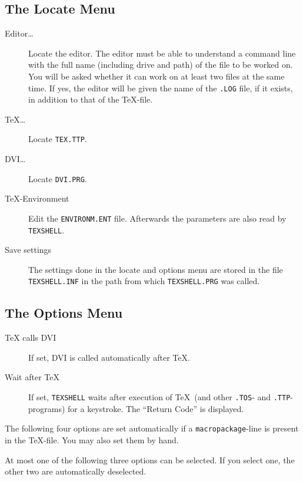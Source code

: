 \subsection*{The Locate Menu}
\begin{description}

\item[Editor\ldots]
Locate the editor. 
The editor must be able to understand a command line with the full name
(including drive and path) of the file to be worked on.
You will be asked whether it can work on at least two files at the same 
time. If yes, the editor will be given the name of the 
{\tt .LOG} file, if it exists, in addition to that of the \TeX-file.

\item[TeX\ldots]
Locate {\tt TEX.TTP}.

\item[DVI\ldots]
Locate {\tt DVI.PRG}.

\item[TeX-Environment]
Edit the {\tt  ENVI\-RON\-M.\-ENT} file.
Afterwards the parameters are also read by {\tt TEX\-SHELL}.

\item[Save settings]
The settings done in the locate and options menu
are stored in the
file {\tt TEX\-SHELL.\-INF} in the path from which
{\tt TEXSHELL.PRG} was called.
\end{description}

\subsection*{The Options Menu}
\begin{description}

\item[TeX calls DVI]
If set, DVI is called automatically after \TeX.

\item[Wait after TeX]
If set, {\tt TEX\-SHELL} waits after execution
of \TeX\ (and other {\tt .TOS}- and {\tt .TTP}-programs) for
a keystroke.
The ``Return Code'' is displayed.
\end{description}

The following four options are set automatically
if a {\tt macro\-package}-line
is present in the \TeX-file.
You may also set them by hand.

At most one of the following three options can be selected.
If you select one, the other two are automatically
deselected.

